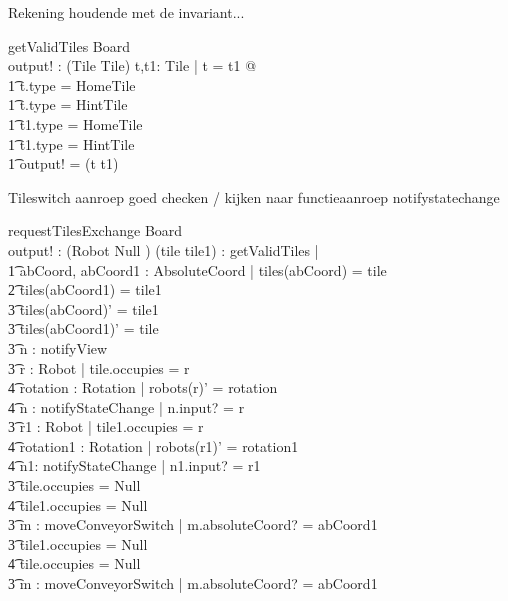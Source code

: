 \documentclass[a4paper,11pt]{article}
\begin{document}
Rekening houdende met de invariant...
\begin{schema}{getValidTiles}
\Xi Board \\
output! : (Tile \cross Tile)
\where
\exists t,t1: Tile | t \not = t1  @ \\ \t1
t.type \not = HomeTile \\ \t1
t.type \not = HintTile \\ \t1
t1.type \not = HomeTile \\ \t1
t1.type \not = HintTile \implies \\ \t1
output! = (t \cross t1)
\end{schema}

Tileswitch aanroep goed checken / kijken naar functieaanroep notifystatechange
\begin{schema}{requestTilesExchange}
\Delta Board \\
output! : ({Robot \union Null} )
\where
\exists (tile \cross tile1) : getValidTiles | \\ \t1
\exists abCoord, abCoord1 : AbsoluteCoord | tiles(abCoord) = tile \\ \t2
tiles(abCoord1) = tile1 \implies \\ \t3
tiles(abCoord)' = tile1 \\ \t3
tiles(abCoord1)' = tile \\ \t3
\exists n : notifyView \\ \t3
\exists r : Robot | tile.occupies = r \implies \\ \t4
\exists rotation : Rotation | robots(r)' = rotation \\ \t4
\exists n : notifyStateChange | n.input? = r \\ \t3
\exists r1 : Robot | tile1.occupies = r \implies \\ \t4
\exists rotation1 : Rotation | robots(r1)' = rotation1 \\ \t4
\exists n1: notifyStateChange | n1.input? = r1 \\ \t3
\IF tile.occupies = Null \\ \t4
tile1.occupies \not = Null\\ \t3
\THEN \exists m : moveConveyorSwitch | m.absoluteCoord? = abCoord1 \\ \t3
\IF tile1.occupies = Null \\ \t4
tile.occupies \not = Null \\ \t3
\THEN \exists m : moveConveyorSwitch | m.absoluteCoord? = abCoord1
\end{schema}
\end{document}
